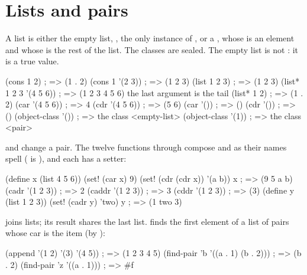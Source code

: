 \section{Lists and pairs}\label{sec:collections-lists}

A list is either the empty list, , the only instance of
, or a , whose  is an element
and whose  is the rest of the list. The classes are sealed. The
empty list is not : it is a true value.

\begin{dylan}
(cons 1 2)                  ; => (1 . 2)
(cons 1 '(2 3))             ; => (1 2 3)
(list 1 2 3)                ; => (1 2 3)
(list* 1 2 3 '(4 5 6))      ; => (1 2 3 4 5 6)      the last argument is the tail
(list* 1 2)                 ; => (1 . 2)
(car '(4 5 6))              ; => 4
(cdr '(4 5 6))              ; => (5 6)
(car '())                   ; => ()
(cdr '())                   ; => ()
(object-class '())          ; => {the class <empty-list>}
(object-class '(1))         ; => {the class <pair>}
\end{dylan}

\noindent {} and  change a pair. The
twelve functions  through  compose  and
 as their names spell ( is
), and each has a setter:

\begin{dylan}
(define x (list 4 5 6))
(set! (car x) 9)
(set! (cdr (cdr x)) '(a b))
x                          ; => (9 5 a b)
(cadr '(1 2 3))            ; => 2
(caddr '(1 2 3))           ; => 3
(cddr '(1 2 3))            ; => (3)
(define y (list 1 2 3))
(set! (cadr y) 'two)
y                          ; => (1 two 3)
\end{dylan}

 joins lists; its result shares the last list.
 finds the first element of a
list of pairs whose car is the item (by ):

\begin{dylan}
(append '(1 2) '(3) '(4 5))               ; => (1 2 3 4 5)
(find-pair 'b '((a . 1) (b . 2)))         ; => (b . 2)
(find-pair 'z '((a . 1)))                 ; => #f
\end{dylan}


